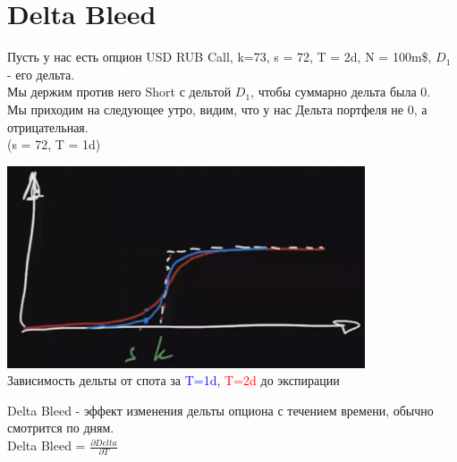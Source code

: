 \documentclass{article}
\begin{document}
\section{Delta Bleed}
Пусть у нас есть опцион USD RUB Call, k=73, s = 72, T = 2d, N = 100m\$, $D_1$ - его дельта.\\
Мы держим против него Short с дельтой $D_1$, чтобы суммарно дельта была 0.\\
Мы приходим на следующее утро, видим, что у нас Дельта портфеля не 0, а отрицательная.\\(s = 72, T = 1d)\\
\begin{center}  
\includegraphics[width=300pt]{picture_10.png}\\
Зависимость дельты от спота за \textcolor{blue}{T=1d}, \textcolor{red}{T=2d} до экспирации
\end{center}  
Delta Bleed - эффект изменения дельты опциона с течением времени, обычно смотрится по дням.\\
Delta Bleed = $\frac{\partial Delta}{\partial T}$\\
\newpage
\end{document}
